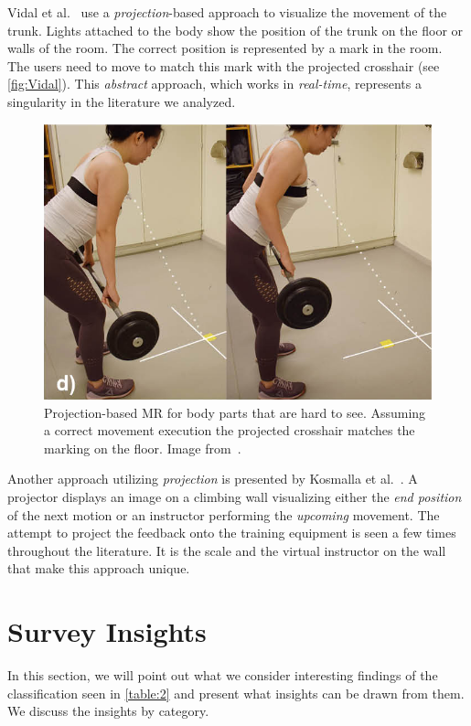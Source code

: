 Vidal et al.~\cite{vidal2020blo} use a \emph{projection}-based approach to visualize the movement of the trunk. Lights attached to the body show the position of the trunk on the floor or walls of the room. The correct position is represented by a mark in the room. The users need to move to match this mark with the projected crosshair (see \autoref{fig:Vidal}). This \emph{abstract} approach, which works in \emph{real-time}, represents a singularity in the literature we analyzed.

\begin{figure}[bt]
    \includegraphics[width=\linewidth]{pictures/Vidal.png}
    \caption{Projection-based MR for body parts that are hard to see. Assuming a correct movement execution the projected crosshair matches the marking on the floor. Image from~\cite{vidal2020blo}.\label{fig:Vidal}}
\end{figure}

Another approach utilizing \emph{projection} is presented by Kosmalla et al.~\cite{kosmalla2017cvi}. A projector displays an image on a climbing wall visualizing either the \emph{end position} of the next motion or an instructor performing the \emph{upcoming} movement. The attempt to project the feedback onto the training equipment is seen a few times throughout the literature. It is the scale and the virtual instructor on the wall that make this approach unique.


\section{Survey Insights\label{sec:tvcg:insights}}
In this section, we will point out what we consider interesting findings of the classification seen in \autoref{table:2} and present what insights can be drawn from them. We discuss the insights by category.


